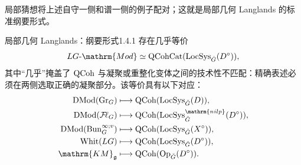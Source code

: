 局部猜想将上述自守一侧和谱一侧的例子配对；这就是局部几何 Langlands 的标准纲要形式\cite{FG05,FG07}。

\begin{conjecture}{局部几何 Langlands：纲要形式}{1.4.1}
存在几乎等价
\[LG\text{-}\mathrm{Mod}\simeq\operatorname{QCohCat}(\LocSys_{\checkG}(D^\circ)),\]
其中“几乎”掩盖了 $\operatorname{QCoh}$ 与凝聚或重整化变体之间的技术性不匹配：精确表述必须在两侧选取正确的凝聚部分。该等价具有以下对应：
\[
\begin{aligned}
\DMod(\Gr_G)&\longmapsto\QCoh(\LocSys_{\checkG}(D)),\\
\DMod(\Fl_G)&\longmapsto\QCoh(\LocSys_{\checkG}^{\mathrm{nilp}}(D^\circ)),\\
\DMod(\Bun_G^{\infty;v})&\longmapsto\QCoh(\LocSys_{\checkG}(X^\circ)),\\
\Whit(LG)&\longmapsto\QCoh(\LocSys_{\checkG}(D^\circ)),\\
\mathrm{KM}_{\mathfrak g}&\longmapsto\QCoh(\Op_{\checkG}(D^\circ)).
\end{aligned}
\]
\end{conjecture}

